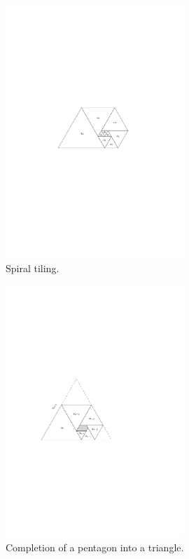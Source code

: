\begin{figure}[htb]
\centering
\includegraphics[width=0.6\textwidth]{img/spiral.pdf}
\caption{Spiral tiling.}
\label{fig:spiral}
\end{figure}

\begin{figure}[htb]
\centering
\includegraphics[width=0.6\textwidth]{img/spiral_triangle.pdf}
\caption{Completion of a pentagon into a triangle.}
\label{fig:spiral2}
\end{figure}

